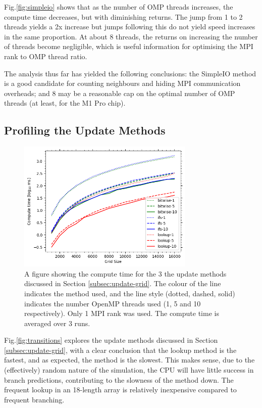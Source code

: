     Fig.\eqref{fig:simpleio} shows that as the number of OMP threads increases, the compute time decreases, but with
    diminishing returns.
    The jump from 1 to 2 threads yields a 2x increase but jumps following this do not yield speed increases in the same
    proportion.
    At about 8 threads, the returns on increasing the number of threads become negligible, which is useful information
    for optimising the MPI rank to OMP thread ratio.

    The analysis thus far has yielded the following conclusions: the SimpleIO method is a good candidate for counting
    neighbours and hiding MPI communication overheads; and 8 may be a reasonable cap on the optimal number of OMP threads
    (at least, for the M1 Pro chip).

    \subsection{Profiling the Update Methods}\label{subsec:prof-trans}
    \begin{figure}[htb]
    \centering
    \includegraphics[width=0.75\textwidth]{./figures/transitions}
    \caption{A figure showing the compute time for the 3 the update methods discussed in Section \eqref{subsec:update-grid}.
        The colour of the line indicates the method used, and the line style (dotted, dashed, solid) indicates the number
        OpenMP threads used (1, 5 and 10 respectively).
        Only 1 MPI rank was used.
        The compute time is averaged over 3 runs.}
    \label{fig:transitions}
    \end{figure}

    Fig.\eqref{fig:transitions} explores the update methods discussed in Section \eqref{subsec:update-grid}, with a
    clear conclusion that the lookup method is the fastest, and as expected, the  method is the slowest.
    This makes sense, due to the (effectively) random nature of the simulation, the CPU will have little success
    in branch predictions, contributing to the slowness of the  method down.
    The frequent lookup in an 18-length array is relatively inexpensive compared to frequent branching.

